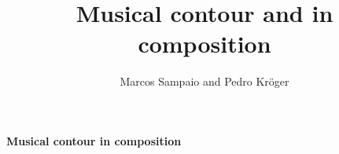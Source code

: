 \documentclass[12pt]{article}
\begin{document}
\title{Musical contour and in composition} 
\author{Marcos Sampaio and Pedro Kröger}

\begin{center}
  \Large \textbf{\textsf{Musical contour in composition}}
\end{center}


\thispagestyle{empty}

\doublespacing


\singlespacing



\end{document}
